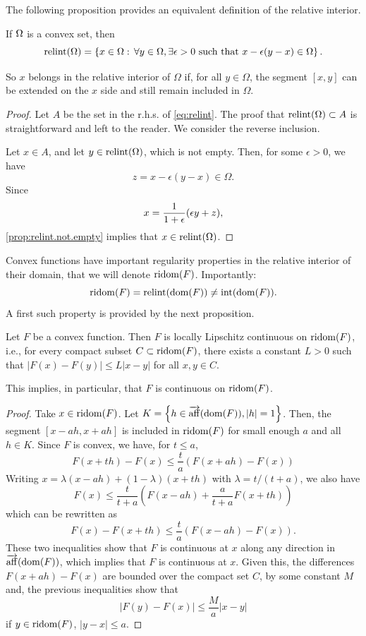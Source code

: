 The following proposition provides an equivalent definition of the relative interior.
\begin{proposition}
\label{prop:relint.aff}
If $\Omega$ is a convex set, then
\begin{equation}
\label{eq:relint}
\mathrm{relint}(\Omega) = \left\{ x\in \Omega:\, \forall y\in \Omega, \exists \epsilon>0 \text{ such that }x - \epsilon(y-x)\in \Omega \right\}.
\end{equation}
\end{proposition}
So $x$ belongs in the relative interior of $\Omega$ if, for all $y\in \Omega$, the segment $[x,y]$ can be extended on the $x$ side and still remain included in $\Omega$.
\begin{proof}
Let $A$ be the set in the r.h.s. of \cref{eq:relint}. The proof that $\mathrm{relint}(\Omega) \subset A$ is straightforward and left to the reader. We consider the reverse inclusion.

Let $x\in A$, and let $y\in \mathrm{relint}(\Omega)$, which is not empty. Then, for some $\epsilon>0$, we have
\[
z = x - \epsilon(y-x)\in \Omega.
\]
Since
\[
x = \frac{1}{1+\epsilon} (\epsilon y + z),
\]
\cref{prop:relint.not.empty} implies that $x\in \mathrm{relint}(\Omega)$.
 \end{proof}
 
Convex functions have important regularity properties in the relative interior of their domain, that we will denote $\mathrm{ridom}(F)$. Importantly: 
\[
\mathrm{ridom}(F) = \mathrm{relint}(\mathrm{dom}(F))  \neq \mathrm{int}(\mathrm{dom}(F)).
\]
A first such property is provided by the next proposition.
\begin{proposition}
\label{prop:conv.lip}
Let $F$ be a convex function. Then $F$ is locally Lipschitz continuous on $\mathrm{ridom}(F)$, i.e., for every compact subset $C \subset \mathrm{ridom}(F)$, there exists a constant $L>0$ such that $|F(x) - F(y)| \leq L|x-y|$ for all $x,y\in C$.  
\end{proposition}
This implies, in particular, that $F$ is continuous on  $\mathrm{ridom}(F)$. 
\begin{proof}
Take $x\in \mathrm{ridom}(F)$. Let $K = \left\{ h\in \overrightarrow{\mathrm{aff}}(\mathrm{dom}(F)), |h|=1 \right\}$. Then,  the segment $[x-ah, x+ah]$ is included in $\mathrm{ridom}(F)$ for small enough $a$ and all $h\in K$. Since $F$ is convex, we have, for $t\leq a$, 
\[
F(x+th) - F(x) \leq \frac{t}{a} (F(x+ah) - F(x))
\]
Writing $x = \lambda (x-ah) + (1-\lambda) (x+th)$ with $\lambda = t/(t+a)$, we also have
\[
F(x) \leq \frac{t}{t+a} (F(x-ah)  + \frac{a}{t+a}  F(x+th))
\]
which can be rewritten as
\[
F(x) - F(x+th) \leq \frac{t}{a} (F(x-ah) - F(x)).
\]
These two inequalities show that $F$ is continuous at $x$ along any direction in $\overrightarrow{\mathrm{aff}}(\mathrm{dom}(F))$, which implies that $F$ is continuous at $x$. Given this, the differences $F(x+ah) - F(x)$ are bounded over the compact set $C$, by some constant $M$ and, the previous inequalities show that
\[
|F(y) - F(x)| \leq \frac{M}{a} |x-y|
\]
if $y \in \mathrm{ridom}(F)$, $|y-x|\leq a$.
 \end{proof}
 




